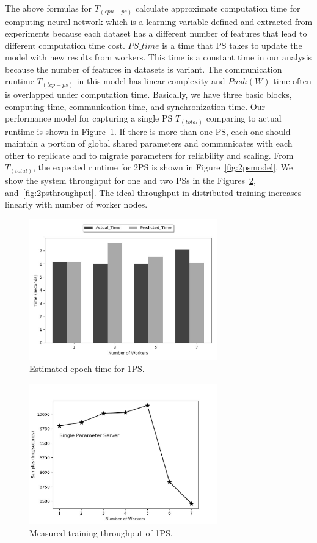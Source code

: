 \documentclass[conference]{IEEEtran}
\begin{document}
The above formulas for $T_{(cpu-ps)}$ calculate approximate computation time for computing neural network which is a learning variable defined and extracted from experiments because each dataset has a different number of features that lead to different computation time cost. $PS\_time$ is a time that PS takes to update the model with new results from workers. This time is a constant time in our analysis because the number of features in datasets is variant. The communication runtime $T_{(tcp-ps)} $ in this model has linear complexity and $Push(W)$ time often is overlapped under computation time. Basically, we have three basic blocks, computing time, communication time, and synchronization time. Our performance model for capturing a single PS $T_{(total)}$ comparing to actual runtime is shown in Figure~\ref{fig:psmodel}. If there is more than one PS, each one should maintain a portion of global shared parameters and communicates with each other to replicate and to migrate parameters for reliability and scaling. From $T_{(total)}$, the expected runtime for 2PS is shown in Figure~\ref{fig:2psmodel}. We show the system throughput for one and two PSs in the Figures~\ref{fig:psthroughput}, and~\ref{fig:2psthroughput}. The ideal throughput in distributed training increases linearly with number of worker nodes. 


\begin{figure}[htb]
  \includegraphics[width=3.2in]{Fig/psmodel.jpg}
  \caption{Estimated epoch time for 1PS.}
  \label{fig:psmodel}
\end{figure}

\begin{figure}[htb]
  \includegraphics[width=3.2in]{Fig/psthroughput.jpg}
  \caption{Measured training throughput of 1PS.}
  \label{fig:psthroughput}
\end{figure}
\end{document}
